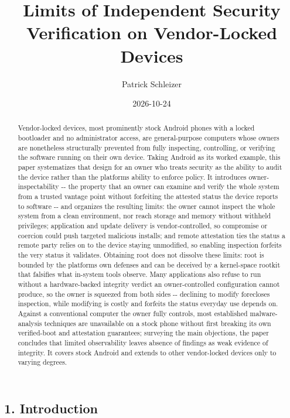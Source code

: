 \documentclass[
]{article}
\title{Limits of Independent Security Verification on Vendor-Locked
Devices}
\author{Patrick Schleizer}
\date{2026-10-24}
\begin{document}
\maketitle
\begin{abstract}
Vendor-locked devices, most prominently stock Android phones with a
locked bootloader and no administrator access, are general-purpose
computers whose owners are nonetheless structurally prevented from fully
inspecting, controlling, or verifying the software running on their own
device. Taking Android as its worked example, this paper systematizes
that design for an owner who treats security as the ability to audit the
device rather than the platform\textquotesingle s ability to enforce
policy. It introduces owner-inspectability -\/- the property that an
owner can examine and verify the whole system from a trusted vantage
point without forfeiting the attested status the device reports to
software -\/- and organizes the resulting limits: the owner cannot
inspect the whole system from a clean environment, nor reach storage and
memory without withheld privileges; application and update delivery is
vendor-controlled, so compromise or coercion could push targeted
malicious installs; and remote attestation ties the status a remote
party relies on to the device staying unmodified, so enabling inspection
forfeits the very status it validates. Obtaining root does not dissolve
these limits: root is bounded by the platform\textquotesingle s own
defenses and can be deceived by a kernel-space rootkit that falsifies
what in-system tools observe. Many applications also refuse to run
without a hardware-backed integrity verdict an owner-controlled
configuration cannot produce, so the owner is squeezed from both sides
-\/- declining to modify forecloses inspection, while modifying is
costly and forfeits the status everyday use depends on. Against a
conventional computer the owner fully controls, most established
malware-analysis techniques are unavailable on a stock phone without
first breaking its own verified-boot and attestation guarantees;
surveying the main objections, the paper concludes that limited
observability leaves absence of findings as weak evidence of integrity.
It covers stock Android and extends to other vendor-locked devices only
to varying degrees.
\end{abstract}

\subsection{1. Introduction}\label{introduction}
\end{document}
